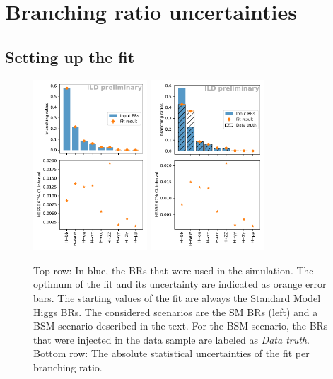 \documentclass[a4paper,11pt]{article}
\begin{document}
\section{Branching ratio uncertainties}\label{sec:fit}

\subsection{Setting up the fit}

\begin{figure}[ht]
    \centering
    \includegraphics[width=0.38\textwidth, keepaspectratio]{br_estimates}
    \includegraphics[width=0.38\textwidth, keepaspectratio]{changed_br_estimates}
    \caption{
        Top row: In blue, the BRs that were used in the simulation.
        The optimum of the fit and its uncertainty are indicated as orange error bars.
        The starting values of the fit are always the Standard Model Higgs BRs.
        The considered scenarios are the SM BRs (left)
        and a BSM scenario described in the text.
        For the BSM scenario, the BRs that were injected in the data sample
        are labeled as \textit{Data truth}.
        \\
        Bottom row: The absolute statistical uncertainties
        of the fit per branching ratio.
    }\label{fig:brs}
\end{figure}
\end{document}

